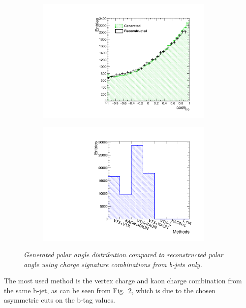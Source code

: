 \begin{figure}
	\centering
	\begin{subfigure}{0.5\textwidth}
		\includegraphics[width=0.95\textwidth]{ILD/plots/top-asymmetry-bonly-gcut.pdf}
		\caption{\label{fig:TopAsymmetryNoCutBjet_a_3} }
	\end{subfigure}%
	\begin{subfigure}{0.5\textwidth}
		\centering
		\includegraphics[width=0.95\textwidth]{ILD/plots/top-methods-bonly-gcut.pdf}
		\caption{\label{fig:TopAsymmetryNoCutBjet_b_3} }
	\end{subfigure}
	\caption{\sl Generated polar angle distribution compared to reconstructed polar angle using charge signature combinations from b-jets only. }
	\label{fig:TopAsymmetryNoCutBjet_3}
\end{figure}

The most used method is the vertex charge and kaon charge combination from the same b-jet, as can be seen from Fig.~\ref{fig:TopAsymmetryNoCutBjet_b_3}, which is due to the chosen asymmetric cuts on the b-tag values. 



